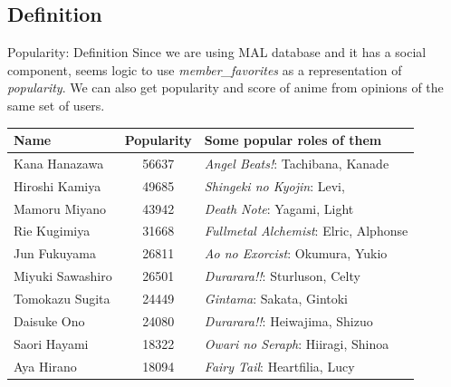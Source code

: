 \subsection{Definition}
\begin{frame}{Popularity: Definition}
Since we are using MAL database and it has a social component, seems logic to use \emph{member\_favorites} as a representation of \emph{popularity}. We can also get popularity and score of anime from opinions of the same set of users.
\vspace{-10pt}

\begin{table}[!h]
	\begin{center}
	\begin{tabular}{|l|c|l|}
		\hline
		Name & Popularity & Some popular roles of them\\ 
		\hline
		Kana Hanazawa & 56637 & \textit{Angel Beats!}: Tachibana, Kanade \\
		\hline
		Hiroshi Kamiya & 49685 & \textit{Shingeki no Kyojin}: Levi, \\
		\hline
		Mamoru Miyano & 43942 & \textit{Death Note}: Yagami, Light \\ 
		\hline
		Rie Kugimiya & 31668 & \textit{Fullmetal Alchemist}: Elric, Alphonse \\ 
		\hline
		Jun Fukuyama & 26811 & \textit{Ao no Exorcist}: Okumura, Yukio \\ 
		\hline
		Miyuki Sawashiro & 26501 & \textit{Durarara!!}: Sturluson, Celty \\ 
		\hline
		Tomokazu Sugita & 24449 & \textit{Gintama}: Sakata, Gintoki \\
		\hline
		Daisuke Ono & 24080 & \textit{Durarara!!}: Heiwajima, Shizuo \\
		\hline
		Saori Hayami & 18322 & \textit{Owari no Seraph}: Hiiragi, Shinoa \\ 
		\hline
		Aya Hirano & 18094 & \textit{Fairy Tail}: Heartfilia, Lucy \\
		\hline
	\end{tabular}
	\end{center}
\end{table}
\end{frame}

